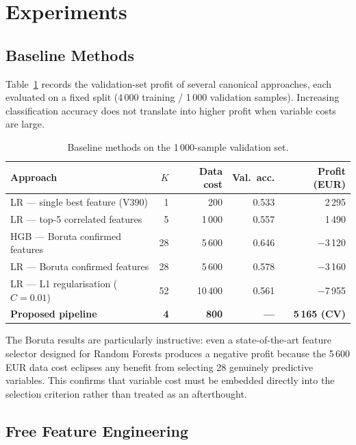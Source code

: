 \documentclass[11pt,a4paper]{article}
\begin{document}
\section{Experiments}

\subsection{Baseline Methods}

Table~\ref{tab:baselines} records the validation-set profit of several canonical approaches,
each evaluated on a fixed split (4\,000 training / 1\,000 validation samples). Increasing
classification accuracy does not translate into higher profit when variable costs are large.

\begin{table}[H]
\centering
\caption{Baseline methods on the 1\,000-sample validation set.}
\label{tab:baselines}
\begin{tabular}{@{}lrrrr@{}}
\toprule
Approach & $K$ & Data cost & Val.\ acc. & Profit (EUR) \\
\midrule
LR --- single best feature (V390) & 1  & 200 & 0.533 & 2\,295 \\
LR --- top-5 correlated features  & 5  & 1\,000 & 0.557 & 1\,490 \\
HGB --- Boruta confirmed features & 28 & 5\,600 & 0.646 & $-$3\,120 \\
LR --- Boruta confirmed features  & 28 & 5\,600 & 0.578 & $-$3\,160 \\
LR --- L1 regularisation ($C=0.01$) & 52 & 10\,400 & 0.561 & $-$7\,955 \\
\midrule
\textbf{Proposed pipeline} & \textbf{4} & \textbf{800} & \textbf{---} & \textbf{5\,165 (CV)} \\
\bottomrule
\end{tabular}
\end{table}

\noindent The Boruta results are particularly instructive: even a state-of-the-art feature
selector designed for Random Forests produces a negative profit because the 5\,600 EUR data
cost eclipses any benefit from selecting 28 genuinely predictive variables. This confirms that
variable cost must be embedded directly into the selection criterion rather than treated as an
afterthought.

\subsection{Free Feature Engineering}
\end{document}
